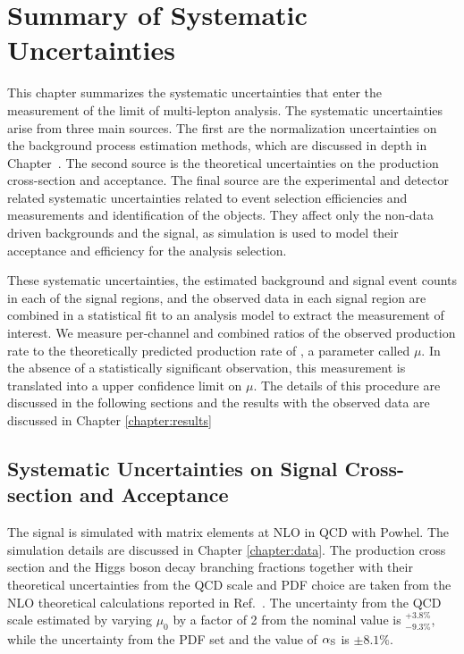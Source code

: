 \chapter[Summary of Systematic Uncertainties][Summary of Systematic Uncertainties]{Summary of Systematic Uncertainties}
\label{chapter:systematics} 

This chapter summarizes the systematic uncertainties that enter the measurement of the limit of \tth multi-lepton analysis. The systematic uncertainties arise from three main sources. The first are the normalization uncertainties on the background process estimation methods, which are discussed in depth in Chapter~\label{chapter:background}. The second source is the theoretical uncertainties on the \tth production cross-section and acceptance. The final source are the experimental and detector related systematic uncertainties related to event selection efficiencies and measurements and identification of the objects. They affect only the non-data driven backgrounds and the \tth signal, as simulation is used to model their acceptance and efficiency for the analysis selection. 

These systematic uncertainties, the estimated background and signal event counts in each of the signal regions, and the observed data in each signal region are combined in a statistical fit to an analysis model to extract the measurement of interest. We measure per-channel and combined ratios of the observed production rate to the theoretically predicted production rate of \tth, a parameter called $\mu$. In the absence of a statistically significant observation, this measurement is translated into a upper confidence limit
on $\mu$. The details of this procedure are discussed in the following sections and the results with the observed data are discussed in Chapter \ref{chapter:results}

\section{Systematic Uncertainties on Signal Cross-section and Acceptance}
\label{section:tth}
The \tth signal is simulated with matrix elements at NLO in QCD with {\textsc Powhel}. The simulation details are discussed in Chapter \ref{chapter:data}. The production cross section and the Higgs boson decay branching fractions together with their theoretical uncertainties from the QCD scale and PDF choice are taken from the NLO theoretical calculations reported in Ref.~\cite{Heinemeyer:2013tqa}. The uncertainty from the QCD scale estimated by varying $\mu_{0}$ by a factor of 2 from the nominal value is $^{+3.8\%}_{-9.3\%}$, while the uncertainty from the PDF set and the value of $\alpha_{\rm S}$ is $\pm 8.1\%$.

